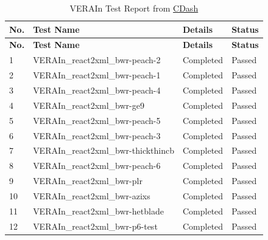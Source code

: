 \begin{longtable}[!ht]{|p{0.75cm}|p{11.25cm}|p{1.6cm}|p{1.1cm}|}
\caption{VERAIn Test Report from \href{https://casl-dev.ornl.gov/cdash/viewTest.php?buildid=149707}{CDash} }\label{tab:str} \\

\hline
\rowcolor{CASLBlue}
\color{white}\textbf{No.} & \color{white}\textbf{Test Name} & \color{white}\textbf{Details} & \color{white}\textbf{Status} \\
\hline
\endfirsthead
\hline
\rowcolor{CASLBlue}
\color{white}\textbf{No.} & \color{white}\textbf{Test Name} & \color{white}\textbf{Details} & \color{white}\textbf{Status} \\
\hline
\endhead
\hline
\endfoot
\hline
\endlastfoot


\rowcolor{caslcolor1}\small 1 & \small VERAIn\_react2xml\_bwr-peach-2 & \small Completed & \small Passed \\\hline
\rowcolor{caslcolor2}\small 2 & \small VERAIn\_react2xml\_bwr-peach-1 & \small Completed & \small Passed \\\hline
\rowcolor{caslcolor1}\small 3 & \small VERAIn\_react2xml\_bwr-peach-4 & \small Completed & \small Passed \\\hline
\rowcolor{caslcolor2}\small 4 & \small VERAIn\_react2xml\_bwr-ge9 & \small Completed & \small Passed \\\hline
\rowcolor{caslcolor1}\small 5 & \small VERAIn\_react2xml\_bwr-peach-5 & \small Completed & \small Passed \\\hline
\rowcolor{caslcolor2}\small 6 & \small VERAIn\_react2xml\_bwr-peach-3 & \small Completed & \small Passed \\\hline
\rowcolor{caslcolor1}\small 7 & \small VERAIn\_react2xml\_bwr-thickthincb & \small Completed & \small Passed \\\hline
\rowcolor{caslcolor2}\small 8 & \small VERAIn\_react2xml\_bwr-peach-6 & \small Completed & \small Passed \\\hline
\rowcolor{caslcolor1}\small 9 & \small VERAIn\_react2xml\_bwr-plr & \small Completed & \small Passed \\\hline
\rowcolor{caslcolor2}\small 10 & \small VERAIn\_react2xml\_bwr-azixs & \small Completed & \small Passed \\\hline
\rowcolor{caslcolor1}\small 11 & \small VERAIn\_react2xml\_bwr-hetblade & \small Completed & \small Passed \\\hline
\rowcolor{caslcolor2}\small 12 & \small VERAIn\_react2xml\_bwr-p6-test & \small Completed & \small Passed \\\hline

\end{longtable}
